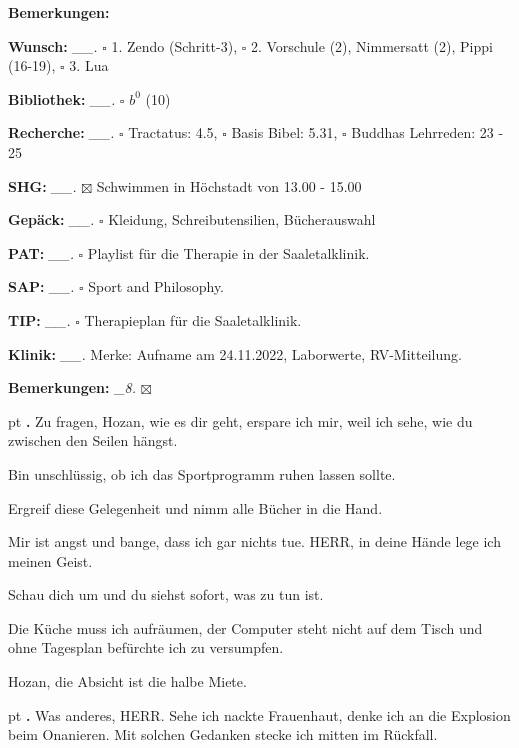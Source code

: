 \documentclass[10pt,a4paper]{article}
\newcounter{notec}
\newcommand\notep[1]{%
  \stepcounter{notec}
  \vskip #1pt
  {\bf\arabic{notec}.}
}
\newcommand\opti[1] {{\color {amethyst} {\bf #1}}}             %
\newcommand\mand[1] {{\color {burntorange} {\bf #1}}}          %
\newcommand\bottomspace{\vskip 4pt}
\newcommand\n[1] { {\sl #1.} \hskip 5pt }
\begin{document}
\begin{mdframed}[style=daystyle]
\begin{labeling}{{\mand {Bemerkungen:}}}
\begin{minipage}{0.75\textwidth}
    \end{minipage}
    \bottomspace
  \item[{\mand {Wunsch:}}]       \n{\_\_} $\square$ 1. Zendo (Schritt-3),
      $\square$ 2. Vorschule (2), Nimmersatt (2), Pippi (16-19), $\square$ 3. Lua
  \item[{\mand {Bibliothek:}}]   \n{\_\_} $\square$ $b^{0}$ (10)
  \item[{\mand {Recherche:}}]    \n{\_\_} $\square$ Tractatus: 4.5, $\square$ Basis Bibel: 5.31,
      $\square$ Buddhas Lehrreden: 23 - 25
  \item[{\mand {SHG:}}]          \n{\_\_} $\boxtimes$ Schwimmen in Höchstadt von 13.00 - 15.00
  \item[{\mand {Gepäck:}}]       \n{\_\_} $\square$ Kleidung, Schreibutensilien, Bücherauswahl
  \item[{\opti {PAT:}}]          \n{\_\_} $\square$ Playlist für die Therapie in der Saaletalklinik.
  \item[{\opti {SAP:}}]          \n{\_\_} $\square$ Sport and Philosophy.
  \item[{\opti {TIP:}}]          \n{\_\_} $\square$ Therapieplan für die Saaletalklinik.
  \item[{\opti {Klinik:}}]       \n{\_\_} Merke: Aufname am 24.11.2022, Laborwerte, RV-Mitteilung.
  \item[{\mand {Bemerkungen:}}]   \n{\_8} $\boxtimes$
  \end{labeling}
    
  \setcounter{notec}{0}
  
  \notep 0 Zu fragen, Hozan, wie es dir geht, erspare ich mir, weil ich sehe,
  wie du zwischen den Seilen hängst.

  \vskip 2pt
  Bin unschlüssig, ob ich das Sportprogramm ruhen lassen sollte.

  \vskip 2pt
  Ergreif diese Gelegenheit und nimm alle Bücher in die Hand.

  \vskip 2pt
  Mir ist angst und bange, dass ich gar nichts tue. HERR, in deine Hände lege
  ich meinen Geist.

  \vskip 2pt
  Schau dich um und du siehst sofort, was zu tun ist.

  \vskip 2pt
  Die Küche muss ich aufräumen, der Computer steht nicht auf dem Tisch und ohne
  Tagesplan befürchte ich zu versumpfen.

  \vskip 2pt
  Hozan, die Absicht ist die halbe Miete.

  
  \notep 4 Was anderes, HERR. Sehe ich nackte Frauenhaut, denke ich an die
  Explosion beim Onanieren. Mit solchen Gedanken stecke ich mitten im Rückfall.


\end{mdframed}
\end{document}

